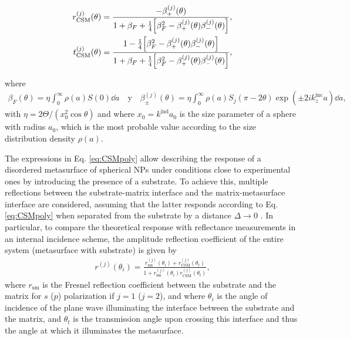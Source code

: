 %
\begin{subequations}%
	\begin{align}%
		r_\text{CSM}^{(j)}(\theta) &= \frac{-\beta_{+}^{(j)}(\theta)}
		{1+\beta_F + \frac{1}{4} \qty[\beta_F^2-\beta_{+}^{(j)}(\theta) \beta_{-}^{(j)}(\theta)]},%
		\\
		t_\text{CSM}^{(j)}(\theta) &= \frac{1 - \frac{1}{4}\qty[\beta_F^2- \beta_{+}^{(j)}(\theta)\beta_{-}^{(j)}(\theta)]}
		{1+\beta_F + \frac{1}{4} \qty[\beta_F^2-\beta_{+}^{(j)}(\theta) \beta_{-}^{(j)}(\theta)]},
	\end{align}%
	\label{eq:CSMpoly}%
\end{subequations}%

where
%
\begin{align}
	\beta_F(\theta) = \eta \int_{0}^{\infty} \rho(a)S(0)\dd{a}
	\quad\text{y}\quad
	\beta_{\pm}^{(j)}(\theta) = \eta \int_{0}^{\infty} \rho (a)S_{j}(\pi-2\theta)\exp(\pm2ik_z^\text{inc} a)\dd{a},
	\label{eq:betas}
\end{align}%
with $\eta = 2 \Theta/(x_0^2 \cos\theta)$ and where $x_0 = k^\text{ind}a_0$ is the size parameter of a sphere with radius $a_0$, which is the most probable value according to the size distribution density $\rho(a)$.

The expressions in Eq. \eqref{eq:CSMpoly} allow describing the response of a disordered metasurface of spherical NPs under conditions close to experimental ones by introducing the presence of a substrate. To achieve this, multiple reflections between the substrate-matrix interface and the matrix-metasurface interface are considered, assuming that the latter responds according to Eq. \eqref{eq:CSMpoly} when separated from the substrate by a distance $\Delta\to 0$ \cite{vazquez-estrada_optical_2014}. In particular, to compare the theoretical response with reflectance measurements in an internal incidence scheme, the amplitude reflection coefficient of the entire system (metasurface with substrate) is given by \cite{vazquez-estrada_optical_2014} 
%
\begin{align}
	r^{(j)}(\theta_i)=\frac{r^{(j)}_\text{sm}(\theta_i)+r^{(j)}_\text{CSM}(\theta_t)}{1+r_\text{sm}^{(j)}(\theta_i)r_\text{CSM}^{(j)}(\theta_t)},
\end{align}
%
where $r_\text{sm}$ is the Fresnel reflection coefficient between the substrate and the matrix for $s$ ($p$) polarization if $j=1$ ($j=2$), and where $\theta_i$ is the angle of incidence of the plane wave illuminating the interface between the substrate and the matrix, and $\theta_t$ is the transmission angle upon crossing this interface and thus the angle at which it illuminates the metasurface.



